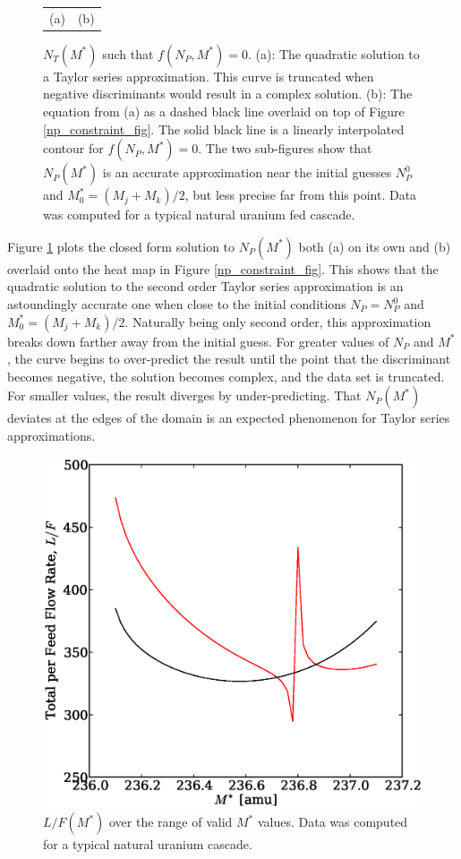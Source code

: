 \documentclass{ansconf}
\begin{document}
\begin{figure}[htpb]
\begin{center}
\begin{tabular}{cc}
(a) & (b) \\
\end{tabular}
\caption{$N_T(M^*)$ such that $f(N_P,M^*)=0$.  (a): The quadratic solution to a
Taylor series approximation. This curve is truncated when negative discriminants 
would result in a complex solution.  (b): The equation from (a) as a dashed black 
line overlaid on top of Figure \ref{np_constraint_fig}.  The solid black line is a 
linearly interpolated contour for $f(N_P, M^*)=0$. The two sub-figures show that 
$N_P(M^*)$ is an accurate  approximation near the initial guesses $N_P^0$ and 
$M_0^*=(M_j+M_k)/2$, but less precise far from this point. Data was computed for 
a typical natural uranium fed cascade.}
\label{np_closed_fig}
\end{center}
\end{figure}

Figure \ref{np_closed_fig} plots the closed form solution to $N_P(M^*)$ both (a)
on its own and (b) overlaid onto the heat map in Figure \ref{np_constraint_fig}.  
This shows that the 
quadratic solution to the second order Taylor series approximation is an astoundingly 
accurate one when close to the initial conditions $N_P=N_P^0$ and $M_0^*=(M_j+M_k)/2$.
Naturally being only second order, this approximation breaks down farther away from 
the initial guess.  For greater values of $N_P$ and $M^*$, the curve begins to 
over-predict the result until the point that the discriminant becomes negative, the
solution becomes complex, and the data set is truncated.  For smaller values, the
result diverges by under-predicting.  That $N_P(M^*)$ deviates at the edges of the
domain is an expected phenomenon for Taylor series approximations.

\begin{figure}[htpb]
\begin{center}
\includegraphics[scale=0.5]{loverf.eps}
\caption{$L/F(M^*)$ over the range of valid $M^*$ values.
Data was computed for a typical natural uranium cascade.}
\label{loverf_fig}
\end{center}
\end{figure}
\end{document}
